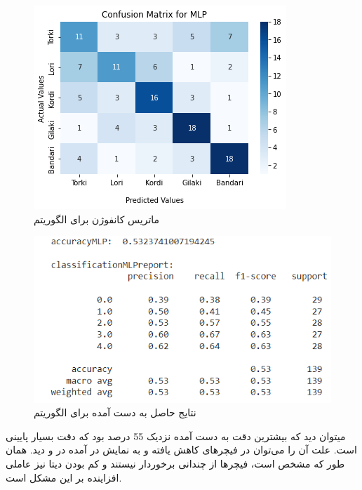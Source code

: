 \begin{figure}[h!]
	\centering
	\includegraphics[width=1\linewidth]{images/mlp_confusion_matrix.png}
	\caption{ماتریس کانفوژن برای الگوریتم }
	\label{fig:mlp_confusion_matrix}
\end{figure}

\begin{figure}[h!]
	\centering
	\includegraphics[width=1\linewidth]{images/mlp_scores.PNG}
	\caption{نتایج حاصل به دست آمده برای الگوریتم }
	\label{fig:mlp_scores}
\end{figure}



میتوان دید که بیشترین دقت به دست آمده نزدیک 55 درصد بود که دقت بسیار پایینی است. علت آن را می‌توان در فیچرهای کاهش یافته و به نمایش در آمده
در  و  دید. همان طور که مشخص است، فیچرها از  چندانی برخوردار نیستند
و کم بودن دیتا نیز عاملی افزاینده بر این مشکل است.

